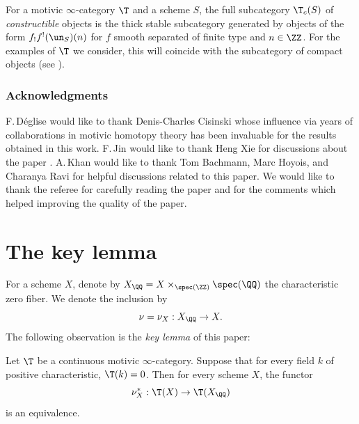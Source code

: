 For a motivic $\infty$-category $\T$ and a scheme $S$, the full subcategory $\T_c(S)$ of \emph{constructible} objects is the thick stable subcategory generated by objects of the form $f_!f^!(\un_S)(n)$ for $f$ smooth separated of finite type and $n \in \ZZ$.
For the examples of $\T$ we consider, this will coincide with the subcategory of compact objects (see \cite[Prop.\,1.4.11]{CD3}).

\subsubsection*{Acknowledgments}
F.\,Déglise would like to thank Denis-Charles Cisinski whose influence via years of collaborations in motivic homotopy theory
has been invaluable for the results obtained in this work.
F.\,Jin would like to thank Heng Xie for discussions about the paper \cite{Jacobson}.
A.\,Khan would like to thank Tom Bachmann, Marc Hoyois, and Charanya Ravi for helpful discussions related to this paper. We would like to thank the referee for carefully reading the paper and for the comments which helped improving the quality of the paper.

\section{The key lemma}
\label{sec:key}

\begin{num}\label{num:zero_part}
For a scheme $X$, denote by $X_\QQ = X\times_{\spec(\ZZ)}\spec(\QQ)$ the characteristic zero fiber.
We denote the inclusion by
\begin{equation*}
\nu = \nu_X : X_\QQ \to X.
\end{equation*}
The following observation is the \textit{key lemma} of this paper:
\end{num}

\begin{lm}
\label{lm:fiber_Q_eq}
Let $\T$ be a continuous motivic $\infty$-category.
Suppose that for every field $k$ of positive characteristic, $\T(k)=0$.
Then for every scheme $X$, the functor
\[
\nu_X^*:\T(X)\to\T(X_\QQ)
\]
is an equivalence.
\end{lm}

